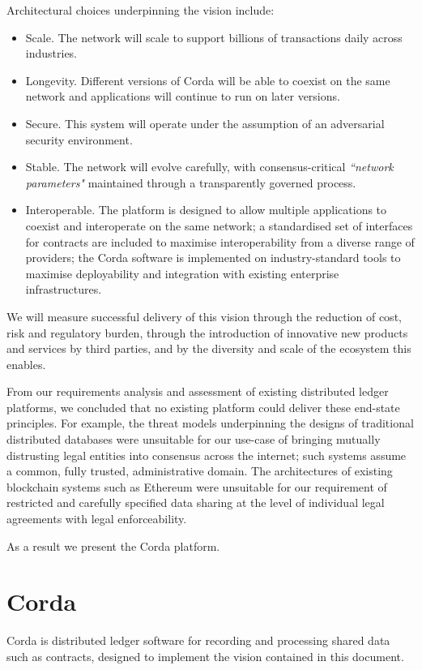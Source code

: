 \documentclass{article}
\begin{document}
Architectural choices underpinning the vision include:
\begin{itemize}
    \item Scale. The network will scale to support billions of transactions daily across industries.
    \item Longevity. Different versions of Corda will be able to coexist on the same network and applications will continue to run on later versions.
    \item Secure. This system will operate under the assumption of an adversarial security environment.
    \item Stable. The network will evolve carefully, with consensus-critical \textit{``network parameters"} maintained through a transparently governed process.
    \item Interoperable. The platform is designed to allow multiple applications to coexist and interoperate on the same network; a standardised set of interfaces for contracts are included to maximise interoperability from a diverse range of providers; the Corda software is implemented on industry-standard tools to maximise deployability and integration with existing enterprise infrastructures.
\end{itemize}

We will measure successful delivery of this vision through the reduction of cost, risk and regulatory burden, through the introduction of innovative new products and services by third parties, and by the diversity and scale of the ecosystem this enables.

From our requirements analysis and assessment of existing distributed ledger platforms, we concluded that no existing platform could deliver these end-state principles. For example, the threat models underpinning the designs of traditional distributed databases were unsuitable for our use-case of bringing mutually distrusting legal entities into consensus across the internet; such systems assume a common, fully trusted, administrative domain. The architectures of existing blockchain systems such as Ethereum were unsuitable for our requirement of restricted and carefully specified data sharing at the level of individual legal agreements with legal enforceability.

As a result we present the Corda platform.

\section{Corda}
Corda is distributed ledger software for recording and processing shared data such as contracts, designed to implement the vision contained in this document.
\end{document}
